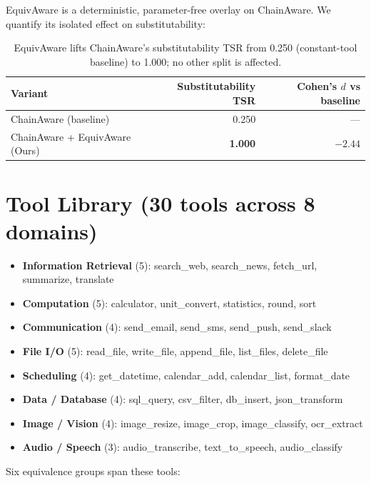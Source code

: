 ﻿\documentclass{article}
\begin{document}
EquivAware is a deterministic, parameter-free overlay on ChainAware. We
quantify its isolated effect on substitutability:

\begin{table}[h]
    \centering
    \small
    \begin{tabular}{lrr}
        \toprule
        Variant & Substitutability TSR & Cohen's $d$ vs baseline \\
        \midrule
        ChainAware (baseline)            & 0.250 & --- \\
        ChainAware + EquivAware (Ours)   & \textbf{1.000} & $-2.44$ \\
        \bottomrule
    \end{tabular}
    \caption{EquivAware lifts ChainAware's substitutability TSR from 0.250 (constant-tool baseline) to 1.000; no other split is affected.}
    \label{tab:equiv-ablation}
\end{table}

\section{Tool Library (30 tools across 8 domains)}
\label{app:tools}

\begin{itemize}
    \item \textbf{Information Retrieval} (5): search\_web, search\_news, fetch\_url, summarize, translate
    \item \textbf{Computation} (5): calculator, unit\_convert, statistics, round, sort
    \item \textbf{Communication} (4): send\_email, send\_sms, send\_push, send\_slack
    \item \textbf{File I/O} (5): read\_file, write\_file, append\_file, list\_files, delete\_file
    \item \textbf{Scheduling} (4): get\_datetime, calendar\_add, calendar\_list, format\_date
    \item \textbf{Data / Database} (4): sql\_query, csv\_filter, db\_insert, json\_transform
    \item \textbf{Image / Vision} (4): image\_resize, image\_crop, image\_classify, ocr\_extract
    \item \textbf{Audio / Speech} (3): audio\_transcribe, text\_to\_speech, audio\_classify
\end{itemize}

Six equivalence groups span these tools:
\end{document}

